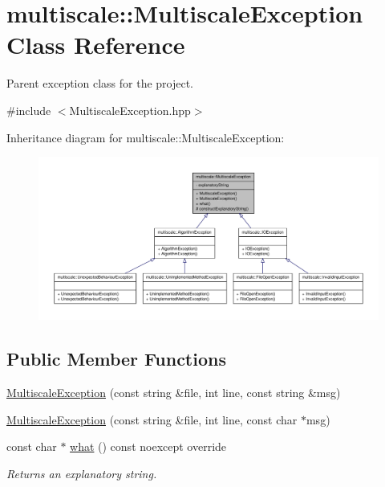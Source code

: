 \hypertarget{classmultiscale_1_1MultiscaleException}{\section{multiscale\-:\-:\-Multiscale\-Exception \-Class \-Reference}
\label{classmultiscale_1_1MultiscaleException}
}


\-Parent exception class for the project.  




{\ttfamily \#include $<$\-Multiscale\-Exception.\-hpp$>$}



\-Inheritance diagram for multiscale\-:\-:\-Multiscale\-Exception\-:\nopagebreak
\begin{figure}[H]
\begin{center}
\leavevmode
\includegraphics[width=350pt]{classmultiscale_1_1MultiscaleException__inherit__graph}
\end{center}
\end{figure}
\subsection*{\-Public \-Member \-Functions}
\begin{DoxyCompactItemize}
\item 
\hyperlink{classmultiscale_1_1MultiscaleException_a6eb7d129f239cc1c4f497b1bbaf94fa5}{\-Multiscale\-Exception} (const string \&file, int line, const string \&msg)
\item 
\hyperlink{classmultiscale_1_1MultiscaleException_a3c0023538ce22fcd663b98a39b12d5a5}{\-Multiscale\-Exception} (const string \&file, int line, const char $\ast$msg)
\item 
const char $\ast$ \hyperlink{classmultiscale_1_1MultiscaleException_a1af231f6e68715087f5be6e4000e8409}{what} () const noexcept override
\begin{DoxyCompactList}\small\item\em \-Returns an explanatory string. \end{DoxyCompactList}\end{DoxyCompactItemize}
